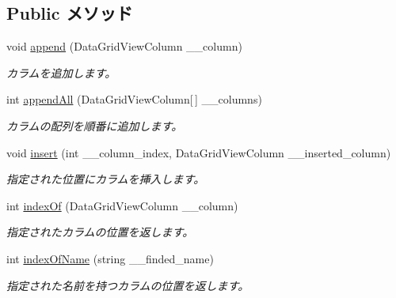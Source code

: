 \subsection*{Public メソッド}
\begin{DoxyCompactItemize}
\item 
void \hyperlink{classlazurite_1_1pattern_1_1building_1_1_data_grid_view_column_builder_a5600475d4e77c99aad1100974e57c15a}{append} (DataGridViewColumn \_\-\_\-column)
\begin{DoxyCompactList}\small\item\em カラムを追加します。 \item\end{DoxyCompactList}\item 
int \hyperlink{classlazurite_1_1pattern_1_1building_1_1_data_grid_view_column_builder_adb64727ec006c6b270a8c1391aa9bcd1}{appendAll} (DataGridViewColumn\mbox{[}$\,$\mbox{]} \_\-\_\-columns)
\begin{DoxyCompactList}\small\item\em カラムの配列を順番に追加します。 \item\end{DoxyCompactList}\item 
void \hyperlink{classlazurite_1_1pattern_1_1building_1_1_data_grid_view_column_builder_a6ad21586ca876a81078b44742dd8de39}{insert} (int \_\-\_\-column\_\-index, DataGridViewColumn \_\-\_\-inserted\_\-column)
\begin{DoxyCompactList}\small\item\em 指定された位置にカラムを挿入します。 \item\end{DoxyCompactList}\item 
int \hyperlink{classlazurite_1_1pattern_1_1building_1_1_data_grid_view_column_builder_a506f5c9d3ee2696b8b70efd81da64e0a}{indexOf} (DataGridViewColumn \_\-\_\-column)
\begin{DoxyCompactList}\small\item\em 指定されたカラムの位置を返します。 \item\end{DoxyCompactList}\item 
int \hyperlink{classlazurite_1_1pattern_1_1building_1_1_data_grid_view_column_builder_a0a78b6ea5e956bc1f4e09e5239783ffe}{indexOfName} (string \_\-\_\-finded\_\-name)
\begin{DoxyCompactList}\small\item\em 指定された名前を持つカラムの位置を返します。 \item\end{DoxyCompactList}\item 

\end{DoxyCompactItemize}
